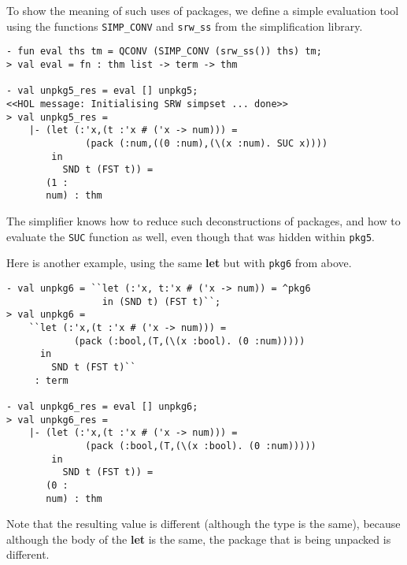To show the meaning of such uses of packages, we define a
simple evaluation tool using the \ML{} functions \texttt{SIMP\_CONV}
and \texttt{srw\_ss}
from the simplification library.
\begin{session}
\begin{verbatim}
- fun eval ths tm = QCONV (SIMP_CONV (srw_ss()) ths) tm;
> val eval = fn : thm list -> term -> thm

- val unpkg5_res = eval [] unpkg5;
<<HOL message: Initialising SRW simpset ... done>>
> val unpkg5_res =
    |- (let (:'x,(t :'x # ('x -> num))) =
              (pack (:num,((0 :num),(\(x :num). SUC x))))
        in
          SND t (FST t)) =
       (1 :
       num) : thm
\end{verbatim}
\end{session}
The simplifier knows how to reduce such deconstructions of packages, and 
how to evaluate the \texttt{SUC} function as well, even though that
was hidden within \texttt{pkg5}.

Here is another example, using the same {\bf let} but with \texttt{pkg6} from above.
\begin{session}
\begin{verbatim}
- val unpkg6 = ``let (:'x, t:'x # ('x -> num)) = ^pkg6
                 in (SND t) (FST t)``;
> val unpkg6 =
    ``let (:'x,(t :'x # ('x -> num))) =
            (pack (:bool,(T,(\(x :bool). (0 :num)))))
      in
        SND t (FST t)``
     : term

- val unpkg6_res = eval [] unpkg6;
> val unpkg6_res =
    |- (let (:'x,(t :'x # ('x -> num))) =
              (pack (:bool,(T,(\(x :bool). (0 :num)))))
        in
          SND t (FST t)) =
       (0 :
       num) : thm
\end{verbatim}
\end{session}
Note that the resulting value is different (although the type is the same),
because although the body of the {\bf let} is the same,
the package that is being unpacked is different.

%

